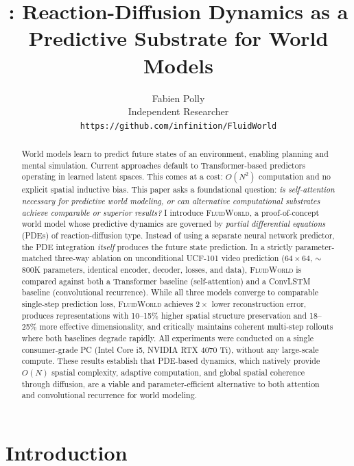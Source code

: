 \documentclass{article}
\title{\fluidworld{}: Reaction-Diffusion Dynamics as a\\Predictive Substrate for World Models}
\author{
  Fabien Polly \\
  Independent Researcher \\
  \texttt{https://github.com/infinition/FluidWorld}
}
\newcommand{\fluidworld}{\textsc{FluidWorld}}
\begin{document}
\maketitle

\begin{abstract}
World models learn to predict future states of an environment, enabling planning and mental simulation. Current approaches default to Transformer-based predictors operating in learned latent spaces. This comes at a cost: $O(N^2)$ computation and no explicit spatial inductive bias. This paper asks a foundational question: \emph{is self-attention necessary for predictive world modeling, or can alternative computational substrates achieve comparable or superior results?} I introduce \fluidworld{}, a proof-of-concept world model whose predictive dynamics are governed by \emph{partial differential equations} (PDEs) of reaction-diffusion type. Instead of using a separate neural network predictor, the PDE integration \emph{itself} produces the future state prediction. In a strictly parameter-matched three-way ablation on unconditional UCF-101 video prediction ($64\!\times\!64$, $\sim$800K parameters, identical encoder, decoder, losses, and data), \fluidworld{} is compared against both a Transformer baseline (self-attention) and a ConvLSTM baseline (convolutional recurrence). While all three models converge to comparable single-step prediction loss, \fluidworld{} achieves $2\times$ lower reconstruction error, produces representations with 10--15\% higher spatial structure preservation and 18--25\% more effective dimensionality, and critically maintains coherent multi-step rollouts where both baselines degrade rapidly. All experiments were conducted on a single consumer-grade PC (Intel Core i5, NVIDIA RTX 4070 Ti), without any large-scale compute. These results establish that PDE-based dynamics, which natively provide $O(N)$ spatial complexity, adaptive computation, and global spatial coherence through diffusion, are a viable and parameter-efficient alternative to both attention and convolutional recurrence for world modeling.
\end{abstract}

\section{Introduction}
\label{sec:introduction}
\end{document}
